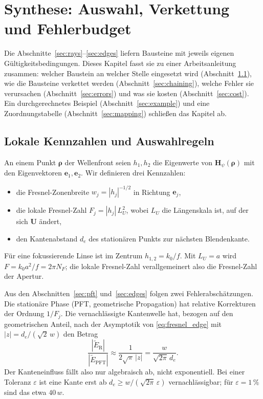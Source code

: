 \documentclass[11pt,a4paper]{scrartcl}
\theoremstyle{insightstyle}
\newcommand{\Hess}{\bm{H}}
\newcommand{\rh}{\bm{\rho}}
\begin{document}
\section{Synthese: Auswahl, Verkettung und Fehlerbudget}\label{sec:synthesis}

Die Abschnitte~\ref{sec:rays}--\ref{sec:edges} liefern Bausteine mit jeweils eigenen Gültigkeitsbedingungen. Dieses Kapitel fasst sie zu einer Arbeitsanleitung zusammen: welcher Baustein an welcher Stelle eingesetzt wird (Abschnitt~\ref{sec:selection}), wie die Bausteine verkettet werden (Abschnitt~\ref{sec:chaining}), welche Fehler sie verursachen (Abschnitt~\ref{sec:errors}) und was sie kosten (Abschnitt~\ref{sec:cost}). Ein durchgerechnetes Beispiel (Abschnitt~\ref{sec:example}) und eine Zuordnungstabelle (Abschnitt~\ref{sec:mapping}) schließen das Kapitel ab.

\subsection{Lokale Kennzahlen und Auswahlregeln}\label{sec:selection}
An einem Punkt $\rh$ der Wellenfront seien $h_1,h_2$ die Eigenwerte von $\Hess_\psi(\rh)$ mit den Eigenvektoren $\bm e_1,\bm e_2$. Wir definieren drei Kennzahlen:
\begin{itemize}
    \item die Fresnel-Zonenbreite $w_j=|h_j|^{-1/2}$ in Richtung $\bm e_j$,
    \item die lokale Fresnel-Zahl $F_j=|h_j|\,L_U^2$, wobei $L_U$ die Längenskala ist, auf der sich $\bm U$ ändert,
    \item den Kantenabstand $d_e$ des stationären Punkts zur nächsten Blendenkante.
\end{itemize}
Für eine fokussierende Linse ist im Zentrum $h_{1,2}=k_0/f$. Mit $L_U=a$ wird $F=k_0a^2/f=2\pi N_F$; die lokale Fresnel-Zahl verallgemeinert also die Fresnel-Zahl der Apertur.

Aus den Abschnitten~\ref{sec:pft} und~\ref{sec:edges} folgen zwei Fehlerabschätzungen. Die stationäre Phase (PFT, geometrische Propagation) hat relative Korrekturen der Ordnung $1/F_j$. Die vernachlässigte Kantenwelle hat, bezogen auf den geometrischen Anteil, nach der Asymptotik von \eqref{eq:fresnel_edge} mit $|z|=d_e/(\sqrt2\,w)$ den Betrag
\begin{equation}
    \frac{|\tilde E_\text{R}|}{|\tilde E_\text{PFT}|} \approx \frac{1}{2\sqrt\pi\,|z|} = \frac{w}{\sqrt{2\pi}\,d_e}.
    \label{eq:edge_ratio}
\end{equation}
Der Kanteneinfluss fällt also nur algebraisch ab, nicht exponentiell. Bei einer Toleranz $\varepsilon$ ist eine Kante erst ab $d_e\ge w/(\sqrt{2\pi}\,\varepsilon)$ vernachlässigbar; für $\varepsilon=1\,\%$ sind das etwa $40\,w$.
\end{document}

